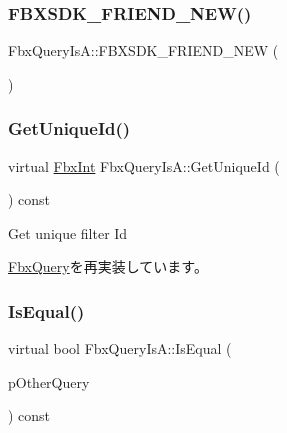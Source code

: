 \subsubsection{\texorpdfstring{F\+B\+X\+S\+D\+K\+\_\+\+F\+R\+I\+E\+N\+D\+\_\+\+N\+E\+W()}{FBXSDK\_FRIEND\_NEW()}}
{\footnotesize\ttfamily Fbx\+Query\+Is\+A\+::\+F\+B\+X\+S\+D\+K\+\_\+\+F\+R\+I\+E\+N\+D\+\_\+\+N\+EW (\begin{DoxyParamCaption}{ }\end{DoxyParamCaption})}

\mbox{\label{class_fbx_query_is_a_acf42ad6bd28bf6543ab09642561ee73b}} 
\subsubsection{\texorpdfstring{Get\+Unique\+Id()}{GetUniqueId()}}
{\footnotesize\ttfamily virtual \hyperlink{fbxtypes_8h_a088fa96de3b0b3ea69f0f6afef525dfb}{Fbx\+Int} Fbx\+Query\+Is\+A\+::\+Get\+Unique\+Id (\begin{DoxyParamCaption}{ }\end{DoxyParamCaption}) const\hspace{0.3cm}{\ttfamily [virtual]}}



Get unique filter Id 



\hyperlink{class_fbx_query_ac7daae8f6fa83cd97ae24e93d7b4dc29}{Fbx\+Query}を再実装しています。

\mbox{\label{class_fbx_query_is_a_a49b41a34152be44240671b8ae59a4d19}} 
\subsubsection{\texorpdfstring{Is\+Equal()}{IsEqual()}}
{\footnotesize\ttfamily virtual bool Fbx\+Query\+Is\+A\+::\+Is\+Equal (\begin{DoxyParamCaption}\item[{\hyperlink{class_fbx_query}{Fbx\+Query} $\ast$}]{p\+Other\+Query }\end{DoxyParamCaption}) const\hspace{0.3cm}{\ttfamily [virtual]}}

